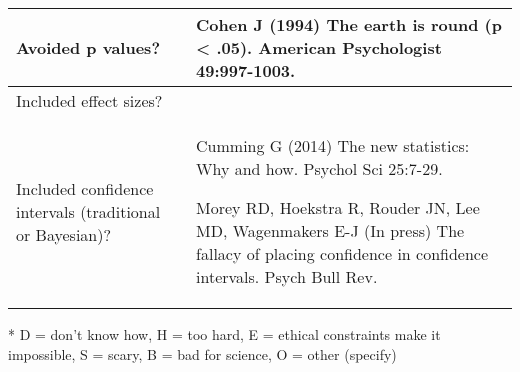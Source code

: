 \documentclass[letterpaper,oneside,11pt,article, landscape]{memoir}
\newenvironment{smlist}{%
\list{}{
\setlength{\topsep}{0in}
\setlength{\partopsep}{0in}
\setlength{\parskip}{0in}
\setlength{\labelsep}{0.05in}
\setlength{\itemindent}{0in}
\setlength{\leftmargin}{0.1in}
\setlength{\labelwidth}{0pt}
\setlength{\listparindent}{0pt}
\setlength{\parsep}{0pt}
\setlength{\itemsep}{0.2ex}
\let\makelabel\textbullet
}
}{\endlist}
\begin{document}
\begin{tabular}{| p{2.5in} | c | p{5.5in} |}
Avoided p values?	&	& \begin{smlist} \item{Cohen J (1994) The earth is round (p < .05). American Psychologist 49:997-1003.
} \end{smlist}		\\ \hline

Included effect sizes? &	&		\\ \hline

Included confidence intervals (traditional or Bayesian)?	&	& \begin{smlist} \item{Cumming G (2014) The new statistics: Why and how. Psychol Sci 25:7-29.} \item{Morey RD, Hoekstra R, Rouder JN, Lee MD, Wagenmakers E-J (In press) The fallacy of placing confidence in confidence intervals. Psych Bull Rev.} \end{smlist}		\\ \hline


\end{tabular}

* D = don't know how, H = too hard, E = ethical constraints make it impossible, S = scary, B = bad for science, O = other (specify)
\end{document}
